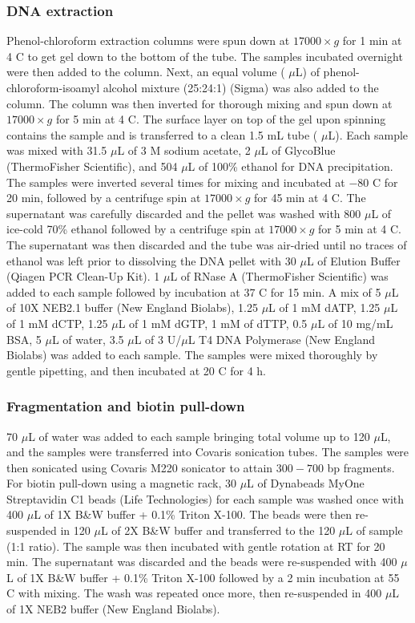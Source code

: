 \subsubsection{DNA extraction}

Phenol-chloroform extraction columns were spun down at $17 000 \times g$ for 1 min at 4 \textdegree C to get gel down to the bottom of the tube.
The samples incubated overnight were then added to the column.
Next, an equal volume ( $\mu$L) of phenol-chloroform-isoamyl alcohol mixture (25:24:1) (Sigma) was also added to the column.
The column was then inverted for thorough mixing and spun down at $17 000 \times g$ for 5 min at 4 \textdegree C.
The surface layer on top of the gel upon spinning contains the sample and is transferred to a clean 1.5 mL tube ( $\mu$L).
Each sample was mixed with 31.5 $\mu$L of 3 M sodium acetate, 2 $\mu$L of GlycoBlue (ThermoFisher Scientific), and 504 $\mu$L of 100\% ethanol for DNA precipitation.
The samples were inverted several times for mixing and incubated at $-80$ \textdegree C for 20 min, followed by a centrifuge spin at $17 000 \times g$ for 45 min at 4 \textdegree C.
The supernatant was carefully discarded and the pellet was washed with 800 $\mu$L of ice-cold 70\% ethanol followed by a centrifuge spin at $17 000 \times g$ for 5 min at 4 \textdegree C.
The supernatant was then discarded and the tube was air-dried until no traces of ethanol was left prior to dissolving the DNA pellet with 30 $\mu$L of Elution Buffer (Qiagen PCR Clean-Up Kit).
1 $\mu$L of RNase A (ThermoFisher Scientific) was added to each sample followed by incubation at 37 \textdegree C for 15 min.
A mix of 5 $\mu$L of 10X NEB2.1 buffer (New England Biolabs), 1.25 $\mu$L of 1 mM dATP, 1.25 $\mu$L of 1 mM dCTP, 1.25 $\mu$L of 1 mM dGTP, 1 mM of dTTP, 0.5 $\mu$L of 10 mg/mL BSA, 5 $\mu$L of water, 3.5 $\mu$L of 3 U/$\mu$L T4 DNA Polymerase (New England Biolabs) was added to each sample.
The samples were mixed thoroughly by gentle pipetting, and then incubated at 20 \textdegree C for 4 h.

\subsubsection{Fragmentation and biotin pull-down}

70 $\mu$L of water was added to each sample bringing total volume up to 120 $\mu$L, and the samples were transferred into Covaris sonication tubes.
The samples were then sonicated using Covaris M220 sonicator to attain $300-700$ bp fragments.
For biotin pull-down using a magnetic rack, 30 $\mu$L of Dynabeads MyOne Streptavidin C1 beads (Life Technologies) for each sample was washed once with 400 $\mu$L of 1X B\&W buffer + 0.1\% Triton X-100.
The beads were then re-suspended in 120 $\mu$L of 2X B\&W buffer and transferred to the 120 $\mu$L of sample (1:1 ratio).
The sample was then incubated with gentle rotation at RT for 20 min.
The supernatant was discarded and the beads were re-suspended with 400 $\mu$L of 1X B\&W buffer + 0.1\% Triton X-100 followed by a 2 min incubation at 55 \textdegree C with mixing.
The wash was repeated once more, then re-suspended in 400 $\mu$L of 1X NEB2 buffer (New England Biolabs).

